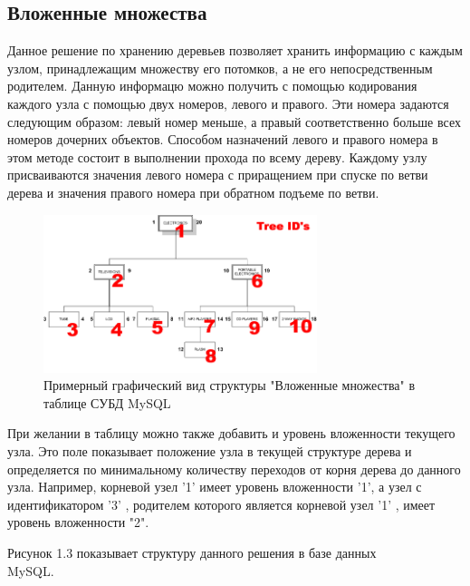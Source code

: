 \documentclass[a4paper,14pt]{extreport}
\theoremstyle{definition}
\begin{document}
\subsection{Вложенные множества}
Данное решение по хранению деревьев позволяет хранить информацию с каждым узлом, принадлежащим множеству его потомков, а не его непосредственным родителем. Данную информацю можно получить с помощью кодирования каждого узла с помощью двух номеров, левого и правого. Эти номера задаются следующим образом: левый номер меньше, а правый соответственно больше всех номеров дочерних объектов. Способом назначений левого и правого номера в этом методе состоит в выполнении прохода по всему дереву. Каждому узлу присваиваются значения левого номера с приращением при спуске по ветви дерева и значения правого номера при обратном подъеме по ветви\cite{Celco}.
\begin{figure}[h!]
\begin{center}
\includegraphics[width=8cm]{13.png}
\caption{Примерный графический вид структуры "Вложенные множества" в таблице СУБД MySQL}
\label{fig:3}
\end{center}
\end{figure}
При желании в таблицу можно также добавить и уровень вложенности текущего узла. Это поле показывает положение узла в текущей структуре дерева и определяется по минимальному количеству переходов от корня дерева до данного узла. Например, корневой узел '1' имеет уровень вложенности '1', а узел с идентификатором '3' , родителем которого является корневой узел '1' , имеет уровень вложенности "2".

Рисунок 1.3 показывает структуру данного решения в базе данных \\MySQL.
\begin{table}[H]
\end{table}
\end{document}
